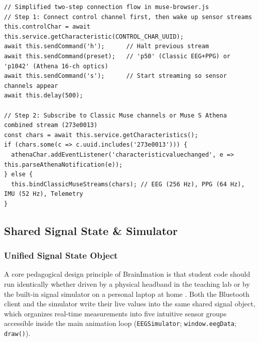 \documentclass[11pt]{article}
\begin{document}
\noindent\begin{minipage}{\textwidth}
\begin{lstlisting}
// Simplified two-step connection flow in muse-browser.js
// Step 1: Connect control channel first, then wake up sensor streams
this.controlChar = await this.service.getCharacteristic(CONTROL_CHAR_UUID);
await this.sendCommand('h');      // Halt previous stream
await this.sendCommand(preset);   // 'p50' (Classic EEG+PPG) or 'p1042' (Athena 16-ch optics)
await this.sendCommand('s');      // Start streaming so sensor channels appear
await this.delay(500);

// Step 2: Subscribe to Classic Muse channels or Muse S Athena combined stream (273e0013)
const chars = await this.service.getCharacteristics();
if (chars.some(c => c.uuid.includes('273e0013'))) {
  athenaChar.addEventListener('characteristicvaluechanged', e => this.parseAthenaNotification(e));
} else {
  this.bindClassicMuseStreams(chars); // EEG (256 Hz), PPG (64 Hz), IMU (52 Hz), Telemetry
}
\end{lstlisting}
\end{minipage}
\vspace{4pt}

\subsection{Shared Signal State \& Simulator}

\subsubsection{Unified Signal State Object}
A core pedagogical design principle of BrainImation is that student code should run identically whether driven by a physical headband in the teaching lab or by the built-in signal simulator on a personal laptop at home \citep{deleeuw2023simulating}. Both the Bluetooth client and the simulator write their live values into the same shared signal object, which organizes real-time measurements into five intuitive sensor groups accessible inside the main animation loop (\texttt{EEGSimulator}; \texttt{window.eegData}; \texttt{draw()}).
\end{document}
